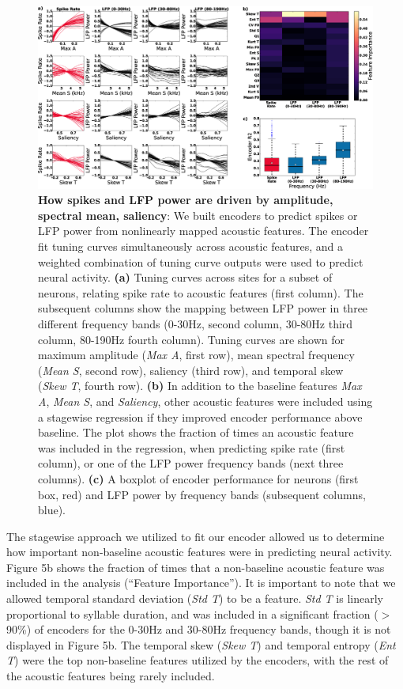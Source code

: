 \begin{figure}
    \caption{\textbf{How spikes and LFP power are driven by amplitude, spectral mean, saliency}: We built encoders to predict spikes or LFP power from nonlinearly mapped acoustic features. The encoder fit tuning curves simultaneously across acoustic features, and a weighted combination of tuning curve outputs were used to predict neural activity. \textbf{(a)} Tuning curves across sites for a subset of neurons, relating spike rate to acoustic features (first column). The subsequent columns show the mapping between LFP power in three different frequency bands (0-30Hz, second column, 30-80Hz third column, 80-190Hz fourth column). Tuning curves are shown for maximum amplitude ({\em Max A}, first row), mean spectral frequency ({\em Mean S}, second row), saliency (third row), and temporal skew ({\em Skew T}, fourth row). \textbf{(b)}  In addition to the baseline features {\em Max A}, {\em Mean S}, and {\em Saliency}, other acoustic features were included using a stagewise regression if they improved encoder performance above baseline. The plot shows the fraction of times an acoustic feature was included in the regression, when predicting spike rate (first column), or one of the LFP power frequency bands (next three columns). \textbf{(c)} A boxplot of encoder performance for neurons (first box, red) and LFP power by frequency bands (subsequent columns, blue).
}
    \centering
    \includegraphics[scale=0.25]{figure5.eps}
\end{figure}

The stagewise approach we utilized to fit our encoder allowed us to determine how important non-baseline acoustic features were in predicting neural activity. Figure 5b shows the fraction of times that a non-baseline acoustic feature was included in the analysis (``Feature Importance''). It is important to note that we allowed temporal standard deviation ({\em Std T}) to be a feature. {\em Std T} is linearly proportional to syllable duration, and was included in a significant fraction ($>$ 90\%) of encoders for the 0-30Hz and 30-80Hz frequency bands, though it is not displayed in Figure 5b. The temporal skew ({\em Skew T}) and temporal entropy ({\em Ent T}) were the top non-baseline features utilized by the encoders, with the rest of the acoustic features being rarely included.

